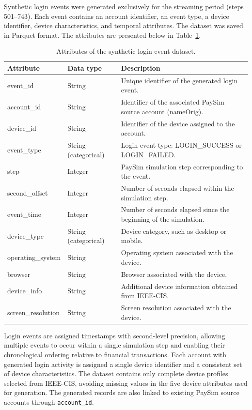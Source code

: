 \documentclass[titlepage]{article}
\begin{document}
Synthetic login events were generated exclusively for the streaming period (steps 501–743). Each event contains an account identifier, an event type, a device identifier, device characteristics, and temporal attributes. The dataset was saved in Parquet format. The attributes are presented below in Table~\ref{tab:login_data_description}.

\begin{table}[H]
    \centering
    \caption{Attributes of the synthetic login event dataset.}
    \label{tab:login_data_description}
    \small
    \begin{tabular}{lll}
        \toprule
        \textbf{Attribute} & \textbf{Data type} & \textbf{Description}\\
        \midrule
        event\_id & String & Unique identifier of the generated login event.\\
        account\_id & String & Identifier of the associated PaySim source account (nameOrig).\\
        device\_id & String & Identifier of the device assigned to the account.\\
        event\_type & String (categorical) & Login event type: LOGIN\_SUCCESS or LOGIN\_FAILED.\\
        step & Integer & PaySim simulation step corresponding to the event.\\
        second\_offset & Integer & Number of seconds elapsed within the simulation step.\\
        event\_time & Integer & Number of seconds elapsed since the beginning of the simulation.\\
        device\_type & String (categorical) & Device category, such as desktop or mobile.\\
        operating\_system & String & Operating system associated with the device.\\
        browser & String & Browser associated with the device.\\
        device\_info & String & Additional device information obtained from IEEE-CIS.\\
        screen\_resolution & String & Screen resolution associated with the device.\\
        \bottomrule
    \end{tabular}
\end{table}

Login events are assigned timestamps with second-level precision, allowing multiple events to occur within a single simulation step and enabling their chronological ordering relative to financial transactions. Each account with generated login activity is assigned a single device identifier and a consistent set of device characteristics. The dataset contains only complete device profiles selected from IEEE-CIS, avoiding missing values in the five device attributes used for generation. The generated records are also linked to existing PaySim source accounts through \texttt{account\_id}.
\end{document}
